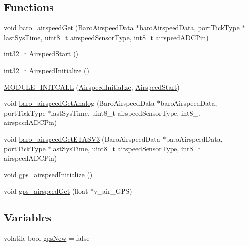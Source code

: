 \subsection*{\-Functions}
\begin{DoxyCompactItemize}
\item 
void \hyperlink{group___airspeed_module_ga76db67751a27b3bcbf75e88ee48148fb}{baro\-\_\-airspeed\-Get} (\-Baro\-Airspeed\-Data $\ast$baro\-Airspeed\-Data, port\-Tick\-Type $\ast$last\-Sys\-Time, uint8\-\_\-t airspeed\-Sensor\-Type, int8\-\_\-t airspeed\-A\-D\-C\-Pin)
\item 
int32\-\_\-t \hyperlink{group___airspeed_module_ga4e599df9b683a64cb49340f7d0386be5}{\-Airspeed\-Start} ()
\item 
int32\-\_\-t \hyperlink{group___airspeed_module_ga3e08decda04632d5570c9a030a96041f}{\-Airspeed\-Initialize} ()
\item 
\hyperlink{group___airspeed_module_ga21ecf0efa7ca0f9597649aa8babdc8b0}{\-M\-O\-D\-U\-L\-E\-\_\-\-I\-N\-I\-T\-C\-A\-L\-L} (\hyperlink{group___airspeed_module_ga3e08decda04632d5570c9a030a96041f}{\-Airspeed\-Initialize}, \hyperlink{group___airspeed_module_ga4e599df9b683a64cb49340f7d0386be5}{\-Airspeed\-Start})
\item 
void \hyperlink{group___airspeed_module_ga11ad675f5f7a043d2cfaada3edf7ae6e}{baro\-\_\-airspeed\-Get\-Analog} (\-Baro\-Airspeed\-Data $\ast$baro\-Airspeed\-Data, port\-Tick\-Type $\ast$last\-Sys\-Time, uint8\-\_\-t airspeed\-Sensor\-Type, int8\-\_\-t airspeed\-A\-D\-C\-Pin)
\item 
void \hyperlink{group___airspeed_module_ga220f144f081ac5d6b18383754ef0572f}{baro\-\_\-airspeed\-Get\-E\-T\-A\-S\-V3} (\-Baro\-Airspeed\-Data $\ast$baro\-Airspeed\-Data, port\-Tick\-Type $\ast$last\-Sys\-Time, uint8\-\_\-t airspeed\-Sensor\-Type, int8\-\_\-t airspeed\-A\-D\-C\-Pin)
\item 
void \hyperlink{group___airspeed_module_ga189c9d3a29580346591f8dd1e03dd919}{gps\-\_\-airspeed\-Initialize} ()
\item 
void \hyperlink{group___airspeed_module_gac8b8ff60998625430e286f7797c5ce67}{gps\-\_\-airspeed\-Get} (float $\ast$v\-\_\-air\-\_\-\-G\-P\-S)
\end{DoxyCompactItemize}
\subsection*{\-Variables}
\begin{DoxyCompactItemize}
\item 
volatile bool \hyperlink{group___airspeed_module_ga92e7d8d768e91460a03e1f0ef2c9a443}{gps\-New} = false
\end{DoxyCompactItemize}


